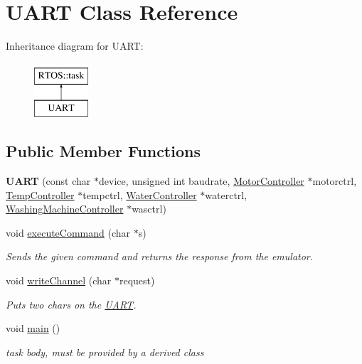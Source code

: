\hypertarget{class_u_a_r_t}{}\section{U\+A\+RT Class Reference}
\label{class_u_a_r_t}
Inheritance diagram for U\+A\+RT\+:\begin{figure}[H]
\begin{center}
\leavevmode
\includegraphics[height=2.000000cm]{class_u_a_r_t}
\end{center}
\end{figure}
\subsection*{Public Member Functions}
\begin{DoxyCompactItemize}
\item 
{\bfseries U\+A\+RT} (const char $\ast$device, unsigned int baudrate, \hyperlink{class_motor_controller}{Motor\+Controller} $\ast$motorctrl, \hyperlink{class_temp_controller}{Temp\+Controller} $\ast$tempctrl, \hyperlink{class_water_controller}{Water\+Controller} $\ast$waterctrl, \hyperlink{class_washing_machine_controller}{Washing\+Machine\+Controller} $\ast$wasctrl)\hypertarget{class_u_a_r_t_a973d29310f6f516b29cc12c68d77b00b}{}\label{class_u_a_r_t_a973d29310f6f516b29cc12c68d77b00b}

\item 
void \hyperlink{class_u_a_r_t_ae8c21c98efeda377a0c881e312f920ca}{execute\+Command} (char $\ast$s)
\begin{DoxyCompactList}\small\item\em Sends the given command and returns the response from the emulator. \end{DoxyCompactList}\item 
void \hyperlink{class_u_a_r_t_aa5eb2b1507904d52e63b808621db32ea}{write\+Channel} (char $\ast$request)
\begin{DoxyCompactList}\small\item\em Puts two chars on the \hyperlink{class_u_a_r_t}{U\+A\+RT}. \end{DoxyCompactList}\item 
void \hyperlink{class_u_a_r_t_a1152951cf37d51a378dc1bb25d36a37d}{main} ()
\begin{DoxyCompactList}\small\item\em task body, must be provided by a derived class \end{DoxyCompactList}\end{DoxyCompactItemize}
